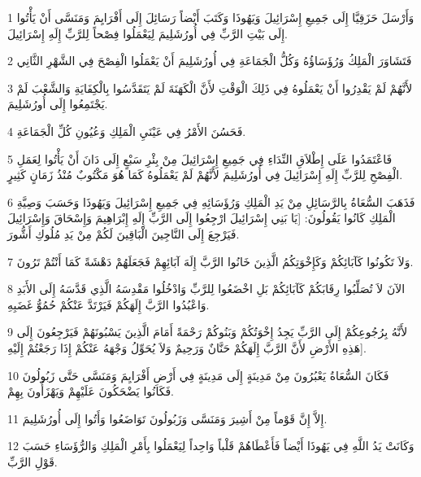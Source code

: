 \par 1 وَأَرْسَلَ حَزَقِيَّا إِلَى جَمِيعِ إِسْرَائِيلَ وَيَهُوذَا وَكَتَبَ أَيْضاً رَسَائِلَ إِلَى أَفْرَايِمَ وَمَنَسَّى أَنْ يَأْتُوا إِلَى بَيْتِ الرَّبِّ فِي أُورُشَلِيمَ لِيَعْمَلُوا فِصْحاً لِلرَّبِّ إِلَهِ إِسْرَائِيلَ.
\par 2 فَتَشَاوَرَ الْمَلِكُ وَرُؤَسَاؤُهُ وَكُلُّ الْجَمَاعَةِ فِي أُورُشَلِيمَ أَنْ يَعْمَلُوا الْفِصْحَ فِي الشَّهْرِ الثَّانِي
\par 3 لأَنَّهُمْ لَمْ يَقْدِرُوا أَنْ يَعْمَلُوهُ فِي ذَلِكَ الْوَقْتِ لأَنَّ الْكَهَنَةَ لَمْ يَتَقَدَّسُوا بِالْكِفَايَةِ وَالشَّعْبَ لَمْ يَجْتَمِعُوا إِلَى أُورُشَلِيمَ.
\par 4 فَحَسُنَ الأَمْرُ فِي عَيْنَيِ الْمَلِكِ وَعُيُونِ كُلِّ الْجَمَاعَةِ.
\par 5 فَاعْتَمَدُوا عَلَى إِطْلاَقِ النِّدَاءِ فِي جَمِيعِ إِسْرَائِيلَ مِنْ بِئْرِ سَبْعٍ إِلَى دَانَ أَنْ يَأْتُوا لِعَمَلِ الْفِصْحِ لِلرَّبِّ إِلَهِ إِسْرَائِيلَ فِي أُورُشَلِيمَ لأَنَّهُمْ لَمْ يَعْمَلُوهُ كَمَا هُوَ مَكْتُوبٌ مُنْذُ زَمَانٍ كَثِيرٍ.
\par 6 فَذَهَبَ السُّعَاةُ بِالرَّسَائِلِ مِنْ يَدِ الْمَلِكِ وَرُؤَسَائِهِ فِي جَمِيعِ إِسْرَائِيلَ وَيَهُوذَا وَحَسَبَ وَصِيَّةِ الْمَلِكِ كَانُوا يَقُولُونَ: [يَا بَنِي إِسْرَائِيلَ ارْجِعُوا إِلَى الرَّبِّ إِلَهِ إِبْرَاهِيمَ وَإِسْحَاقَ وَإِسْرَائِيلَ فَيَرْجِعَ إِلَى النَّاجِينَ الْبَاقِينَ لَكُمْ مِنْ يَدِ مُلُوكِ أَشُّورَ.
\par 7 وَلاَ تَكُونُوا كَآبَائِكُمْ وَكَإِخْوَتِكُمُ الَّذِينَ خَانُوا الرَّبَّ إِلَهَ آبَائِهِمْ فَجَعَلَهُمْ دَهْشَةً كَمَا أَنْتُمْ تَرُونَ.
\par 8 الآنَ لاَ تُصَلِّبُوا رِقَابَكُمْ كَآبَائِكُمْ بَلِ اخْضَعُوا لِلرَّبِّ وَادْخُلُوا مَقْدِسَهُ الَّذِي قَدَّسَهُ إِلَى الأَبَدِ وَاعْبُدُوا الرَّبَّ إِلَهَكُمْ فَيَرْتَدَّ عَنْكُمْ حُمُوُّ غَضَبِهِ.
\par 9 لأَنَّهُ بِرُجُوعِكُمْ إِلَى الرَّبِّ يَجِدُ إِخْوَتُكُمْ وَبَنُوكُمْ رَحْمَةً أَمَامَ الَّذِينَ يَسْبُونَهُمْ فَيَرْجِعُونَ إِلَى هَذِهِ الأَرْضِ لأَنَّ الرَّبَّ إِلَهَكُمْ حَنَّانٌ وَرَحِيمٌ وَلاَ يُحَوِّلُ وَجْهَهُ عَنْكُمْ إِذَا رَجَعْتُمْ إِلَيْهِ].
\par 10 فَكَانَ السُّعَاةُ يَعْبُرُونَ مِنْ مَدِينَةٍ إِلَى مَدِينَةٍ فِي أَرْضِ أَفْرَايِمَ وَمَنَسَّى حَتَّى زَبُولُونَ فَكَانُوا يَضْحَكُونَ عَلَيْهِمْ وَيَهْزَأُونَ بِهِمْ.
\par 11 إِلاَّ إِنَّ قَوْماً مِنْ أَشِيرَ وَمَنَسَّى وَزَبُولُونَ تَوَاضَعُوا وَأَتُوا إِلَى أُورُشَلِيمَ.
\par 12 وَكَانَتْ يَدُ اللَّهِ فِي يَهُوذَا أَيْضاً فَأَعْطَاهُمْ قَلْباً وَاحِداً لِيَعْمَلُوا بِأَمْرِ الْمَلِكِ وَالرُّؤَسَاءِ حَسَبَ قَوْلِ الرَّبِّ.
